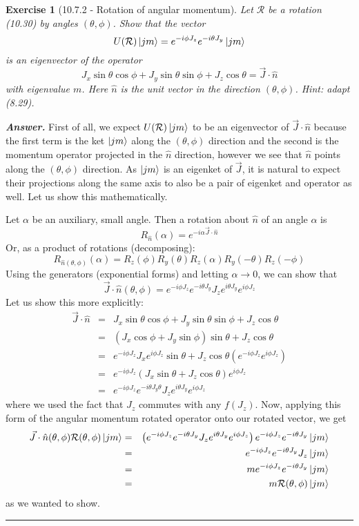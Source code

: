 \documentclass[12pt]{article}
\def\be{\begin{equation}}
\def\ee{\end{equation}}
\def\bea{\begin{eqnarray*}}
\def\eea{\end{eqnarray*}}
\def\l{\left}
\def\r{\right}
\newtheorem{exercise}{Exercise}
\newenvironment{answer}{\noindent\textbf{\textit{Answer.}} \normalfont }{\par\noindent\rule{\textwidth}{0.4pt}}
\begin{document}
	
	\begin{exercise}[10.7.2 - Rotation of angular momentum]
		Let $\mathcal{R}$ be a rotation (10.30) by angles $(\theta, \phi)$. Show that the vector
		\be
			U(\mathcal{R})\ket{jm} = e^{-i\phi J_z}e^{-i\theta J_y}\ket{jm}
		\ee
		is an eigenvector of the operator
		\be
			J_x \sin\theta \cos\phi + J_y \sin\theta\sin\phi + J_z \cos\theta = \vec{J}\cdot\hat{n}
		\ee
		with eigenvalue $m$. Here $\hat{n}$ is the unit vector in the direction $(\theta, \phi)$. Hint: adapt (8.29).		
	\end{exercise}
	\begin{answer}
		First of all, we expect $U(\mathcal{R})\ket{jm}$ to be an eigenvector of $\vec{J}\cdot\hat{n}$ because the first term is the ket $\ket{jm}$ along the $(\theta, \phi)$ direction and the second is the momentum operator projected in the $\hat{n}$ direction, however we see that $\hat{n}$ points along the $(\theta, \phi)$ direction. As $\ket{jm}$ is an eigenket of $\vec{J}$, it is natural to expect their projections along the same axis to also be a pair of eigenket and operator as well. Let us show this mathematically.

		Let $\alpha$ be an auxiliary, small angle. Then a rotation about $\hat{n}$ of an angle $\alpha$ is
		\be
			R_{\hat{n}}(\alpha) = e^{-i\alpha \vec{J}\cdot\hat{n}}
		\ee
		Or, as a product of rotations (decomposing):
		\be
			R_{\hat{n}(\theta, \phi)}(\alpha) = R_z(\phi)R_y(\theta)R_z(\alpha)R_y(-\theta)R_z(-\phi)
		\ee
		Using the generators (exponential forms) and letting $\alpha\to0$, we can show that
		\be
			\vec{J}\cdot\hat{n}(\theta, \phi) = e^{-i\phi J_z}e^{-i\theta J_y} J_z e^{i\theta J_y} e^{i\phi J_z}
		\ee
		Let us show this more explicitly:
		\bea
			\vec{J}\cdot\hat{n} &=& J_x \sin\theta \cos\phi + J_y \sin\theta\sin\phi + J_z \cos\theta \\
				&=& \l(J_x \cos\phi + J_y \sin\phi\r)\sin\theta + J_z \cos\theta \\
				&=& e^{-i\phi J_z} J_x e^{i\phi J_z}\sin\theta + J_z\cos\theta\l (e^{-i \phi J_z}e^{i\phi J_z} \r) \\
				&=& e^{-i\phi J_z} \l( J_x \sin\theta + J_z\cos\theta\r)e^{i\phi J_z} \\
				&=& e^{-i\phi J_z} e^{-i\theta J_y\theta} J_z e^{i\theta J_y}e^{i\phi J_z}
		\eea
		where we used the fact that $J_z$ commutes with any $f(J_z)$. Now, applying this form of the angular momentum rotated operator onto our rotated vector, we get
		\bea
			\vec{J}\cdot\hat{n}(\theta, \phi)\mathcal{R}(\theta, \phi)\ket{jm} &=& \l(e^{-i\phi J_z}e^{-i\theta J_y} J_z e^{i\theta J_y} e^{i\phi J_z} \r)  e^{-i\phi J_z}e^{-i\theta J_y}\ket{jm} \\
				&=& e^{-i\phi J_z}e^{-i\theta J_y} J_z \ket{jm} \\
				&=& m e^{-i\phi J_z}e^{-i\theta J_y} \ket{jm} \\
				&=& m \mathcal{R}(\theta, \phi)\ket{jm}
		\eea
		as we wanted to show. 
		
	\end{answer}
	
\end{document}
